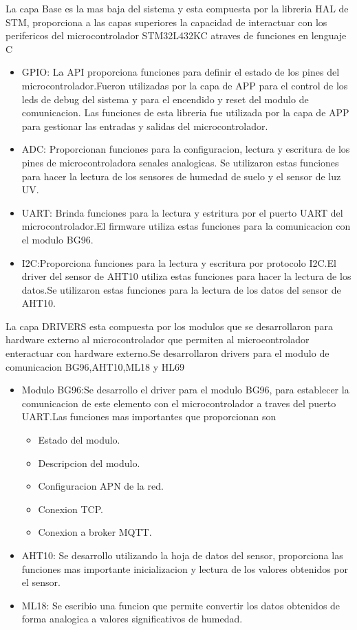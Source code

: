  La capa Base es la mas baja del sistema y esta compuesta por la libreria HAL de STM, proporciona a las capas superiores la capacidad de interactuar con los perifericos del  microcontrolador STM32L432KC atraves de funciones en lenguaje C
  \begin{itemize}
    \item GPIO: La API proporciona funciones para definir el estado de los pines del microcontrolador.Fueron utilizadas por la capa de APP para el control de los leds de debug del sistema y para el encendido y reset del modulo de comunicacion. Las funciones de esta libreria fue utilizada por la capa de APP para gestionar las entradas y salidas del microcontrolador.
    \item ADC: Proporcionan funciones para la configuracion, lectura y escritura de los pines de microcontroladora senales analogicas. Se utilizaron estas funciones para hacer la lectura de los sensores de humedad de suelo y el sensor de luz UV.
    \item UART: Brinda funciones para la lectura y estritura por el puerto UART del microcontrolador.El firmware utiliza estas funciones para la comunicacion con el modulo BG96.
    \item I2C:Proporciona funciones para la lectura y escritura por protocolo I2C.El driver del sensor de AHT10 utiliza estas funciones para hacer la lectura de los datos.Se utilizaron estas funciones para la lectura de los datos del sensor de AHT10.
    
  \end{itemize}


La capa DRIVERS esta compuesta por los modulos que se desarrollaron para hardware externo al microcontrolador que permiten al microcontrolador enteractuar con hardware externo.Se desarrollaron drivers para el modulo de comunicacion BG96,AHT10,ML18 y HL69
\begin{itemize}
  \item Modulo BG96:Se desarrollo el driver para el modulo BG96, para establecer la comunicacion de este elemento con el microcontrolador a traves del puerto UART.Las funciones mas importantes que proporcionan son
  \begin{itemize}
    \item Estado del modulo.
    \item Descripcion del modulo.
    \item Configuracion APN de la red.
    \item Conexion TCP.
    \item Conexion a broker MQTT.
  \end{itemize}
  \item AHT10: Se desarrollo utilizando la hoja de datos del sensor, proporciona las funciones mas importante inicializacion y lectura de los valores obtenidos por el sensor.
  \item ML18: Se escribio una funcion que permite convertir los datos obtenidos de forma analogica a valores significativos de humedad.
  
\end{itemize}

